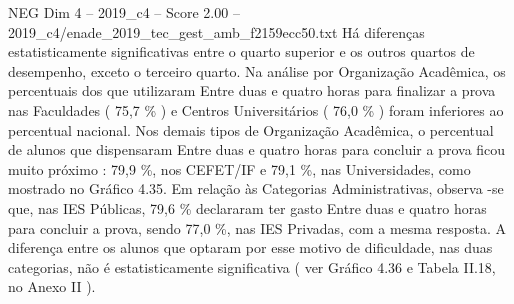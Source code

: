 \begin{textsample}{NEG Dim 4 – 2019\_c4 – Score 2.00 – 2019\_c4/enade\_2019\_tec\_gest\_amb\_f2159ecc50.txt}
Há diferenças estatisticamente significativas entre o quarto superior e os outros quartos de desempenho, exceto o terceiro quarto.
Na análise por Organização Acadêmica, os percentuais dos que utilizaram Entre duas e quatro horas para finalizar a prova nas Faculdades ( 75,7 \% ) e Centros Universitários ( 76,0 \% ) foram inferiores ao percentual nacional.
Nos demais tipos de Organização Acadêmica, o percentual de alunos que dispensaram Entre duas e quatro horas para concluir a prova ficou muito próximo : 79,9 \%, nos CEFET/IF e 79,1 \%, nas Universidades, como mostrado no Gráfico 4.35.
Em relação às Categorias Administrativas, observa -se que, nas IES Públicas, 79,6 \% declararam ter gasto Entre duas e quatro horas para concluir a prova, sendo 77,0 \%, nas IES Privadas, com a mesma resposta.
A diferença entre os alunos que optaram por esse motivo de dificuldade, nas duas categorias, não é estatisticamente significativa ( ver Gráfico 4.36 e Tabela II.18, no Anexo II ).

\end{textsample}
